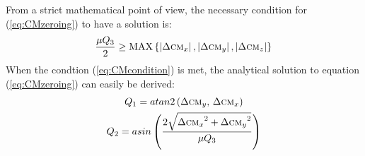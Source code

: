 From a strict mathematical point of view, the necessary condition for (\ref{eq:CMzeroing}) to have a solution is:
\begin{equation}\label{eq:CMcondition}
\frac{\mu Q_3}{2}\geq \textup{MAX}\left \{ \left | \Delta \textsc{cm}_x \right |, \left | \Delta \textsc{cm}_y \right |,\left | \Delta \textsc{cm}_z \right |\right \}
\end{equation}
When the condtion (\ref{eq:CMcondition}) is met, the analytical solution to equation (\ref{eq:CMzeroing}) can easily be derived:
\begin{gather}\label{eq:CMsolution}
Q_1=atan2\left({\Delta \textsc{cm}_y},\, {\Delta \textsc{cm}_x}\right)\\
Q_2=asin\left(\frac{2\sqrt{{\Delta \textsc{cm}_x}^2+{\Delta \textsc{cm}_y}^2}}{\mu Q_3} \right)
\end{gather}

